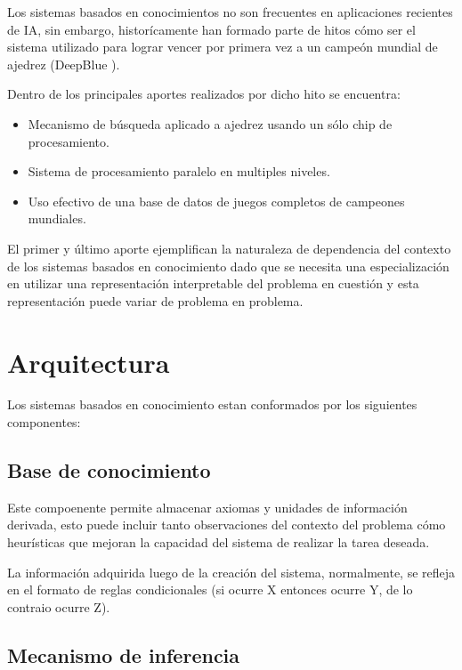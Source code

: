 Los sistemas basados en conocimientos no son frecuentes en aplicaciones recientes de IA, sin embargo, histor\'icamente han formado parte de hitos c\'omo ser el sistema utilizado para lograr vencer por primera vez a un campe\'on mundial de ajedrez (DeepBlue \citet{CAMPBELL200257}).

Dentro de los principales aportes realizados por dicho hito se encuentra:

\begin{itemize}
    \item Mecanismo de b\'usqueda aplicado a ajedrez usando un s\'olo chip de procesamiento.
    \item Sistema de procesamiento paralelo en multiples niveles.
    \item Uso efectivo de una base de datos de juegos completos de campeones mundiales.
\end{itemize}

El primer y \'ultimo aporte ejemplifican la naturaleza de dependencia del contexto de los sistemas basados en conocimiento dado que se necesita una especializaci\'on en utilizar una representaci\'on interpretable del problema en cuesti\'on y esta representaci\'on puede variar de problema en problema.

\section{Arquitectura}

Los sistemas basados en conocimiento estan conformados por los siguientes componentes:

\subsection{Base de conocimiento}

Este compoenente permite almacenar axiomas y unidades de informaci\'on derivada, esto puede incluir tanto observaciones del contexto del problema c\'omo heur\'isticas que mejoran la capacidad del sistema de realizar la tarea deseada.

La informaci\'on adquirida luego de la creaci\'on del sistema, normalmente, se refleja en el formato de reglas condicionales (si ocurre X entonces ocurre Y, de lo contraio ocurre Z).

\subsection{Mecanismo de inferencia}

